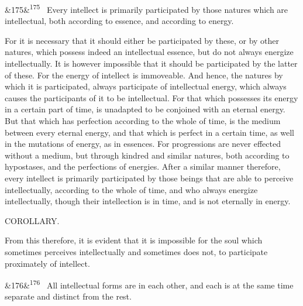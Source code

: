 \documentclass[12pt]{article}
\newcommand{\para}[1][]{\par\noindent\ifx&#1&\else\textsuperscript{\footnotesize #1}~\fi}
\begin{document}
\para[175] Every intellect is primarily participated by those natures which are intellectual, both according to essence, and according to energy.

For it is necessary that it should either be participated by these, or by other natures, which possess indeed an intellectual essence, but do not always energize intellectually. It is however impossible that it should be participated by the latter of these. For the energy of intellect is immoveable. And hence, the natures by which it is participated, always participate of intellectual energy, which always causes the participants of it to be intellectual. For that which possesses its energy in a certain part of time, is unadapted to be conjoined with an eternal energy. But that which has perfection according to the whole of time, is the medium between every eternal energy, and that which is perfect in a certain time, as well in the mutations of energy, as in essences. For progressions are never effected without a medium, but through kindred and similar natures, both according to hypostases, and the perfections of energies. After a similar manner therefore, every intellect is primarily participated by those beings that are able to perceive intellectually, according to the whole of time, and who always energize intellectually, though their intellection is in time, and is not eternally in energy.

COROLLARY.

From this therefore, it is evident that it is impossible for the soul which sometimes perceives intellectually and sometimes does not, to participate proximately of intellect.

\para[176] All intellectual forms are in each other, and each is at the same time separate and distinct from the rest.
\end{document}
